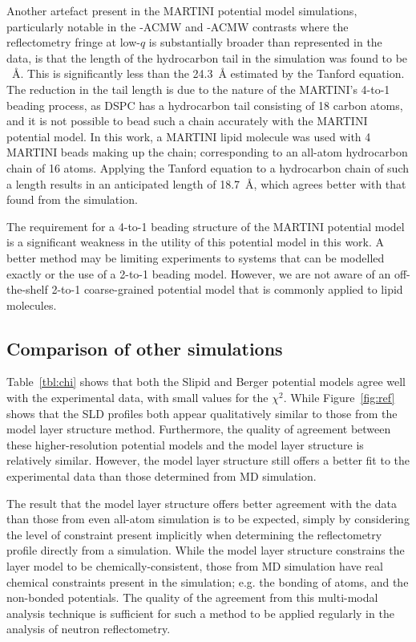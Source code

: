 \documentclass[amsmath,amssymb,twocolumn,superscriptaddress]{revtex4-1}
\begin{document}
Another artefact present in the MARTINI potential model simulations, particularly notable in the -ACMW and -ACMW contrasts where the reflectometry fringe at low-$q$ is substantially broader than represented in the data, is that the length of the hydrocarbon tail in the simulation was found to be ~\si{\angstrom}.
This is significantly less than the \SI{24.3}{\angstrom} estimated by the Tanford equation.
The reduction in the tail length is due to the nature of the MARTINI's 4-to-1 beading process, as DSPC has a hydrocarbon tail consisting of 18 carbon atoms, and it is not possible to bead such a chain accurately with the MARTINI potential model.
In this work, a MARTINI lipid molecule was used with 4 MARTINI beads making up the chain; corresponding to an all-atom hydrocarbon chain of 16 atoms.
Applying the Tanford equation to a hydrocarbon chain of such a length results in an anticipated length of \SI{18.7}{\angstrom}, which agrees better with that found from the simulation.

The requirement for a 4-to-1 beading structure of the MARTINI potential model is a significant weakness in the utility of this potential model in this work.
A better method may be limiting experiments to systems that can be modelled exactly or the use of a 2-to-1 beading model.
However, we are not aware of an off-the-shelf 2-to-1 coarse-grained potential model that is commonly applied to lipid molecules.

\subsection{Comparison of other simulations}
Table~\ref{tbl:chi} shows that both the Slipid and Berger potential models agree well with the experimental data, with small values for the $\chi^2$.
While Figure~\ref{fig:ref} shows that the SLD profiles both appear qualitatively similar to those from the model layer structure method.
Furthermore, the quality of agreement between these higher-resolution potential models and the model layer structure is relatively similar.
However, the model layer structure still offers a better fit to the experimental data than those determined from MD simulation.

The result that the model layer structure offers better agreement with the data than those from even all-atom simulation is to be expected, simply by considering the level of constraint present implicitly when determining the reflectometry profile directly from a simulation.
While the model layer structure constrains the layer model to be chemically-consistent, those from MD simulation have real chemical constraints present in the simulation; e.g. the bonding of atoms, and the non-bonded potentials.
The quality of the agreement from this multi-modal analysis technique is sufficient for such a method to be applied regularly in the analysis of neutron reflectometry.
\end{document}
